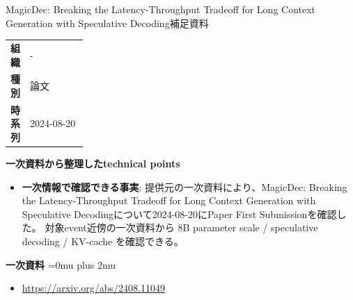 \begin{technicalnote}{MagicDec: Breaking the Latency-Throughput Tradeoff for Long Context Generation with Speculative Decoding}{補足資料}
\begingroup
\begin{tabularx}{\linewidth}{@{}>{\bfseries}p{0.22\linewidth}X@{}}
組織 & - \\
種別 & 論文 \\
時系列 & 2024-08-20 \\
\end{tabularx}
\smallskip
{\bfseries 一次資料から整理したtechnical points}
\begin{itemize}[leftmargin=1.5em,itemsep=0.35em]
\item \textbf{一次情報で確認できる事実}: 提供元の一次資料により、MagicDec: Breaking the Latency-Throughput Tradeoff for Long Context Generation with Speculative Decodingについて2024-08-20にPaper First Submissionを確認した。 対象event近傍の一次資料から 8B parameter scale / speculative decoding / KV-cache を確認できる。
\end{itemize}
\begin{minipage}{\linewidth}
\begin{samepage}
{\bfseries 一次資料}
\begingroup\sloppy
\Urlmuskip=0mu plus 2mu\relax
\begin{itemize}[leftmargin=1.5em,itemsep=0.25em]
\item {\scriptsize\url{https://arxiv.org/abs/2408.11049}}
\end{itemize}
\endgroup
\end{samepage}
\end{minipage}
\endgroup
\end{technicalnote}
\medskip

